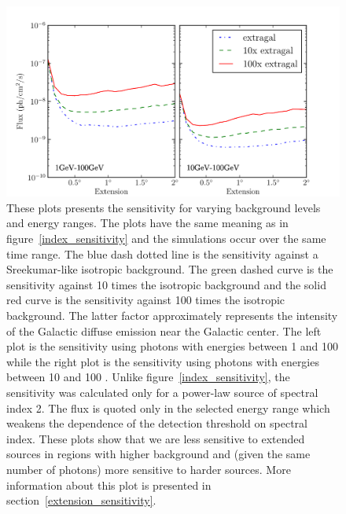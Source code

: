 \documentclass[12pt,preprint]{aastex}
\newcommand{\gev}{\text{GeV}\xspace}
\begin{document}
\clearpage

\begin{figure}
  \begin{center}
    \includegraphics{mc_plots/diff_factor_sensitivity.pdf}
    \end{center}
    \caption{
    These plots presents the sensitivity for varying background
    levels and energy ranges.  The plots have the same meaning as in
    figure~\ref{index_sensitivity} and the simulations occur over the
    same time range.  The blue dash dotted line is the sensitivity
    against a Sreekumar-like isotropic background. The green dashed
    curve is the sensitivity against 10 times the isotropic background
    and the solid red curve is the sensitivity against 100 times the
    isotropic background.  The latter factor approximately represents
    the intensity of the Galactic diffuse emission near the Galactic
    center.  The left plot is the sensitivity using photons with energies
    between 1 \gev and 100 \gev while the right plot is the sensitivity
    using photons with energies between 10 \gev and 100 \gev. Unlike
    figure~\ref{index_sensitivity}, the sensitivity was calculated
    only for a power-law source of spectral index 2. The flux is quoted
    only in the selected energy range which weakens the dependence of
    the detection threshold on spectral index.  These plots show that
    we are less sensitive to extended sources in regions with higher
    background and (given the same number of photons) more sensitive
    to harder sources.  More information about this plot is presented
    in section~\ref{extension_sensitivity}.
    }\label{diff_factor_sensitivity}
  \end{figure}
\end{document}
